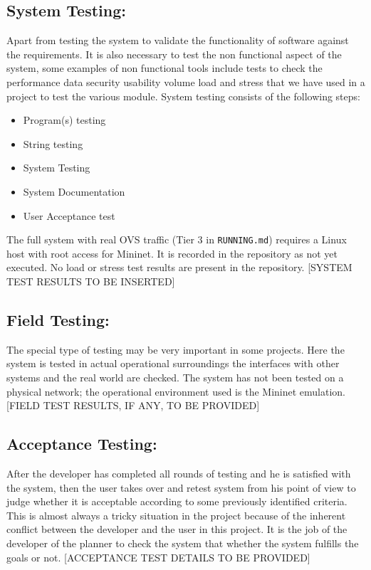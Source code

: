 \documentclass[12pt,a4paper]{report}
\begin{document}
\subsection{System Testing:}

Apart from testing the system to validate the functionality of software against the requirements. It is also necessary to test the non functional aspect of the system, some examples of non functional tools include tests to check the performance data security usability volume load and stress that we have used in a project to test the various module. System testing consists of the following steps:
\begin{itemize}
 \item Program(s) testing
\item String testing
\item System Testing
\item System Documentation
\item User Acceptance test
\end{itemize}
The full system with real OVS traffic (Tier 3 in \texttt{RUNNING.md}) requires a Linux host with root access for Mininet. It is recorded in the repository as not yet executed. No load or stress test results are present in the repository. [SYSTEM TEST RESULTS TO BE INSERTED]
 \subsection{Field Testing:}

The special type of testing may be very important in some projects. Here the system is tested in actual operational surroundings the interfaces with other systems and the real world are checked. The system has not been tested on a physical network; the operational environment used is the Mininet emulation. [FIELD TEST RESULTS, IF ANY, TO BE PROVIDED]

 \subsection{Acceptance Testing:}

After the developer has completed all rounds of testing and he is satisfied with the system, then the user takes over and retest system from his point of view to judge whether it is acceptable according to some previously identified criteria. This is almost always a tricky situation in the project because of the inherent conflict between the developer and the user in this project. It is the job of the developer of the planner to check the system that whether the system fulfills the goals or not. [ACCEPTANCE TEST DETAILS TO BE PROVIDED]
\end{document}
